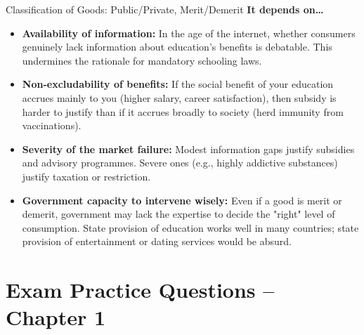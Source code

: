 \documentclass[11pt, a4paper, twoside]{book}
\begin{document}
\begin{evaluation}{Classification of Goods: Public/Private, Merit/Demerit}
\textbf{It depends on\ldots}
\begin{itemize}[leftmargin=*, nosep]
\item \textbf{Availability of information:} In the age of the internet, whether consumers genuinely lack information about education's benefits is debatable. This undermines the rationale for mandatory schooling laws.
\item \textbf{Non-excludability of benefits:} If the social benefit of your education accrues mainly to you (higher salary, career satisfaction), then subsidy is harder to justify than if it accrues broadly to society (herd immunity from vaccinations).
\item \textbf{Severity of the market failure:} Modest information gaps justify subsidies and advisory programmes. Severe ones (e.g., highly addictive substances) justify taxation or restriction.
\item \textbf{Government capacity to intervene wisely:} Even if a good is merit or demerit, government may lack the expertise to decide the "right" level of consumption. State provision of education works well in many countries; state provision of entertainment or dating services would be absurd.
\end{itemize}
\end{evaluation}

\section{Exam Practice Questions -- Chapter 1}
\end{document}

